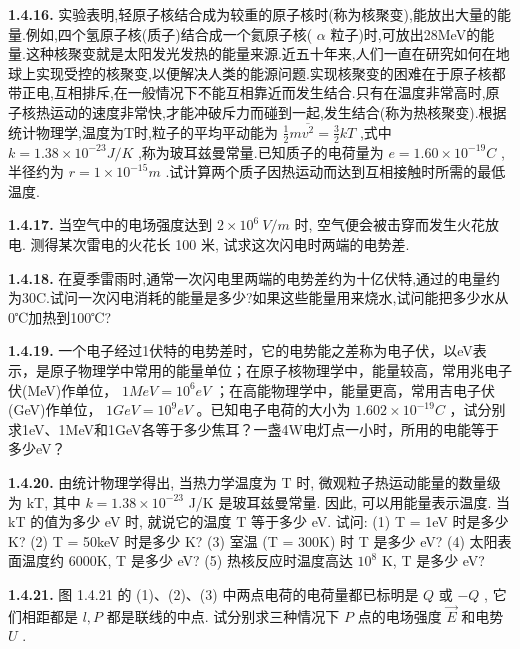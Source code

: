 \vfill

\textbf{1.4.16.} 实验表明,轻原子核结合成为较重的原子核时(称为核聚变),能放出大量的能量.例如,四个氢原子核(质子)结合成一个氦原子核( $\alpha$ 粒子)时,可放出28MeV的能量.这种核聚变就是太阳发光发热的能量来源.近五十年来,人们一直在研究如何在地球上实现受控的核聚变,以便解决人类的能源问题.实现核聚变的困难在于原子核都带正电,互相排斥,在一般情况下不能互相靠近而发生结合.只有在温度非常高时,原子核热运动的速度非常快,才能冲破斥力而碰到一起,发生结合(称为热核聚变).根据统计物理学,温度为T时,粒子的平均平动能为 $\displaystyle \frac{1}{2}m\overline{v^{2}}=\frac{3}{2}kT$ ,式中 $k=1.38\times10^{-23}J/K$ ,称为玻耳兹曼常量.已知质子的电荷量为 $e=1.60\times10^{-19}C$ ,半径约为 $r=1\times10^{-15}m$ .试计算两个质子因热运动而达到互相接触时所需的最低温度.

\vfill

\newpage
\textbf{1.4.17.} 当空气中的电场强度达到 $2 \times 10^{6} ~V/m$ 时, 空气便会被击穿而发生火花放电. 测得某次雷电的火花长 100 米, 试求这次闪电时两端的电势差.

\vfill

\textbf{1.4.18.} 在夏季雷雨时,通常一次闪电里两端的电势差约为十亿伏特,通过的电量约为30C.试问一次闪电消耗的能量是多少?如果这些能量用来烧水,试问能把多少水从0℃加热到100℃?

\vfill

\newpage
\textbf{1.4.19.} 一个电子经过1伏特的电势差时，它的电势能之差称为电子伏，以eV表示，是原子物理学中常用的能量单位；在原子核物理学中，能量较高，常用兆电子伏(MeV)作单位， $1MeV=10^{6}eV$ ；在高能物理学中，能量更高，常用吉电子伏(GeV)作单位， $1GeV=10^{9}eV$ 。已知电子电荷的大小为 $1.602\times10^{-19}C$ ，试分别求1eV、1MeV和1GeV各等于多少焦耳？一盏4W电灯点一小时，所用的电能等于多少eV？

\vfill

\textbf{1.4.20.} 由统计物理学得出, 当热力学温度为 T 时, 微观粒子热运动能量的数量级为 kT, 其中 $k = 1.38 \times 10^{-23}$ J/K 是玻耳兹曼常量. 因此, 可以用能量表示温度. 当 kT 的值为多少 eV 时, 就说它的温度 T 等于多少 eV. 试问: (1) T = 1eV 时是多少 K? (2) T = 50keV 时是多少 K? (3) 室温 (T = 300K) 时 T 是多少 eV? (4) 太阳表面温度约 6000K, T 是多少 eV? (5) 热核反应时温度高达 $10^{8}$ K, T 是多少 eV?

\vfill

\newpage
\textbf{1.4.21.} 图 1.4.21 的 (1)、(2)、(3) 中两点电荷的电荷量都已标明是 $Q$ 或 $-Q$ , 它们相距都是 $l, P$ 都是联线的中点. 试分别求三种情况下 $P$ 点的电场强度 $\vec{E}$ 和电势 $U$ .

\vfill

